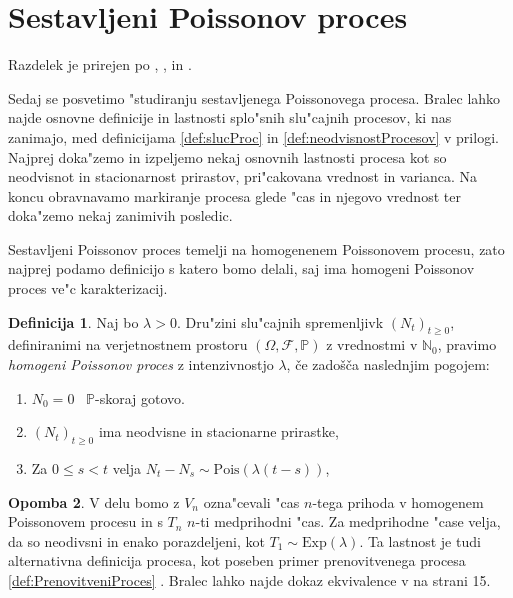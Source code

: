 \documentclass[12pt, a4paper, reqno]{amsart}
\theoremstyle{definition}
\newtheorem{definicija}{Definicija}[section]
\newtheorem{opomba}[definicija]{Opomba}
\theoremstyle{plain}
\newcommand{\N}{\mathbb{N}}
\newcommand{\Prob}{\mathbb{P}}
\newcommand{\1}{\mathds{1}}
\newcommand{\Pois}[1]{\text{Pois}(#1)}
\newcommand*{\refPriloga}[1]{%
  \begingroup
    \hypersetup{
      linkcolor=red,
      linkbordercolor=red,
    }%
    \ref{#1}%
  \endgroup
}
\begin{document}
    \newpage


\section{Sestavljeni Poissonov proces}

    \noindent
    Razdelek je prirejen po \cite{1}, \cite{2}, in \cite{3}.

    Sedaj se posvetimo "studiranju sestavljenega Poissonovega procesa. Bralec lahko najde 
    osnovne definicije in lastnosti splo"snih slu"cajnih procesov, ki nas zanimajo, 
     med definicijama \refPriloga{def:slucProc} in \refPriloga{def:neodvisnostProcesov} v prilogi.
    Najprej doka"zemo in izpeljemo nekaj osnovnih lastnosti procesa kot so neodvisnot in stacionarnost
    prirastov, pri"cakovana vrednost in varianca. Na koncu obravnavamo markiranje procesa glede "cas in 
    njegovo vrednost ter doka"zemo nekaj zanimivih posledic.

    Sestavljeni Poissonov proces temelji na homogenenem Poissonovem procesu, zato najprej podamo definicijo 
    s katero bomo delali, saj ima homogeni Poissonov proces ve"c karakterizacij. 

    \begin{definicija}
        Naj bo $\lambda > 0$. Dru"zini slu"cajnih spremenljivk $(N_t)_{t\geq 0}$, definiranimi na verjetnostnem 
        prostoru $(\Omega, \mathcal{F}, \mathbb{P})$ z vrednostmi v $\N_0$, pravimo 
        \textit{homogeni Poissonov proces} z intenzivnostjo $\lambda$, če zadošča naslednjim pogojem:
        \begin{enumerate}
            \item $N_0 = 0$ \ $\Prob$-skoraj gotovo.
            \item $(N_t)_{t\geq 0}$ ima neodvisne in stacionarne prirastke,
            \item Za $0 \leq s < t$ velja $ N_t - N_s \sim\Pois{\lambda(t - s)}$,
        \end{enumerate}
        \label{def:HPP}
    \end{definicija}

    \begin{opomba}
    V delu bomo z $V_n$ ozna"cevali "cas $n$-tega prihoda v homogenem Poissonovem procesu in s $T_n$ $n$-ti 
    medprihodni "cas. Za medprihodne "case velja, da so neodivsni in enako porazdeljeni, kot 
    $T_1 \sim \text{Exp}(\lambda)$. Ta lastnost je tudi alternativna definicija procesa, kot poseben 
    primer prenovitvenega procesa \refPriloga{def:PrenovitveniProces}. Bralec 
    lahko najde dokaz ekvivalence v \cite{10} na strani 15.
    \end{opomba}
\end{document}
